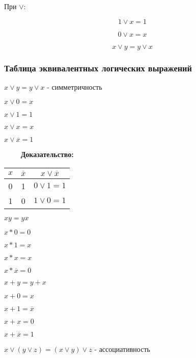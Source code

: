 \documentclass[russian]{lecture-notes}
\begin{document}
\begin{sloppypar}
\begin{proposition*}
    При $\lor$:
    
    $$1 \lor x = 1$$
    
    $$0 \lor x = x$$
    
    $$x \lor y = y \lor x$$
\end{proposition*}

\subsubsection{Таблица эквивалентных логических выражений}

\begin{proposition}
    $x \lor y = y \lor x $ - симметричность
    

    $x \lor 0 = x$
    

    $x \lor 1 = 1$
    

    $x \lor x = x$
    

    $x \lor \overline{x} = 1 $
        
        
        $\qquad$ \textbf{Доказательство:}
        
        
    \begin{table}[h!]
		\centering		
		\begin{tabular}{|c|c|c|}
			\hline
			$x$ & $\overline{x}$ & $x \lor \overline{x}$ \\ \hline
			0 & 1 & $0 \lor 1 = 1$ \\ \hline
			1 & 0 & $1 \lor 0 = 1$ \\ \hline
		\end{tabular}
	\end{table}
        
    $xy = yx $

    $x*0 = 0$
    
    $x*1 = x$

    $x*x = x$

    $x* \overline{x} = 0$

    $x+y = y + x$
    
    $x + 0 = x$

    $x + 1 = \overline{x}$

    $x + x = 0$

    $x + \overline{x} = 1 $

\end{proposition}

\begin{proposition}
    
    $x \lor (y\lor z) = (x \lor y ) \lor z$ - ассоциативность
    

\end{proposition}
\end{sloppypar}
\end{document}
